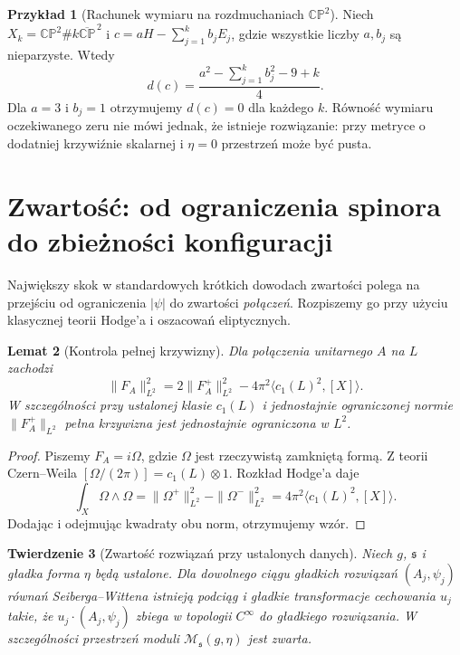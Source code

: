 \documentclass[11pt,a4paper]{report}
\numberwithin{equation}{section}
\theoremstyle{plain}
\newtheorem{twierdzenie}{Twierdzenie}[section]
\newtheorem{lemat}[twierdzenie]{Lemat}
\theoremstyle{definition}
\newtheorem{przyklad}[twierdzenie]{Przykład}
\theoremstyle{remark}
\begin{document}
\begin{przyklad}[Rachunek wymiaru na rozdmuchaniach $\mathbb{CP}^2$]
Niech $X_k=\mathbb{CP}^2\#k\overline{\mathbb{CP}}^{\,2}$
i $c=aH-\sum_{j=1}^k b_jE_j$, gdzie wszystkie liczby
$a,b_j$ są nieparzyste. Wtedy
\[
d(c)=\frac{a^2-\sum_{j=1}^k b_j^2-9+k}{4}.
\]
Dla $a=3$ i $b_j=1$ otrzymujemy $d(c)=0$ dla każdego $k$.
Równość wymiaru oczekiwanego zeru nie mówi jednak,
że istnieje rozwiązanie: przy metryce o dodatniej
krzywiźnie skalarnej i $\eta=0$ przestrzeń może być pusta.
\end{przyklad}

\section{Zwartość: od ograniczenia spinora do zbieżności konfiguracji}
\label{sec:tg-sw12-compact}

Największy skok w standardowych krótkich dowodach
zwartości polega na przejściu od ograniczenia $|\psi|$
do zwartości \emph{połączeń}. Rozpiszemy go przy użyciu
klasycznej teorii Hodge'a i oszacowań eliptycznych.

\begin{lemat}[Kontrola pełnej krzywizny]
\label{lem:tg-sw12-curvature}
Dla połączenia unitarnego $A$ na $L$ zachodzi
\[
\|F_A\|_{L^2}^2=2\|F_A^+\|_{L^2}^2
-4\pi^2\langle c_1(L)^2,[X]\rangle.
\]
W szczególności przy ustalonej klasie $c_1(L)$
i jednostajnie ograniczonej normie $\|F_A^+\|_{L^2}$
pełna krzywizna jest jednostajnie ograniczona w $L^2$.
\end{lemat}

\begin{proof}
Piszemy $F_A=i\Omega$, gdzie $\Omega$ jest rzeczywistą
zamkniętą formą. Z teorii Czern--Weila
$[\Omega/(2\pi)]=c_1(L)\otimes1$.
Rozkład Hodge'a daje
\[
\int_X\Omega\wedge\Omega
=\|\Omega^+\|_{L^2}^2-\|\Omega^-\|_{L^2}^2
=4\pi^2\langle c_1(L)^2,[X]\rangle.
\]
Dodając i odejmując kwadraty obu norm, otrzymujemy wzór.
\end{proof}

\begin{twierdzenie}[Zwartość rozwiązań przy ustalonych danych]
\label{thm:tg-sw12-compact}
Niech $g$, $\mathfrak s$ i gładka forma $\eta$ będą ustalone.
Dla dowolnego ciągu gładkich rozwiązań
$(A_j,\psi_j)$ równań Seiberga--Wittena istnieją podciąg
i gładkie transformacje cechowania $u_j$ takie, że
$u_j\cdot(A_j,\psi_j)$ zbiega w topologii $C^\infty$
do gładkiego rozwiązania. W szczególności przestrzeń
moduli $\mathcal M_{\mathfrak s}(g,\eta)$ jest zwarta.
\end{twierdzenie}
\end{document}
